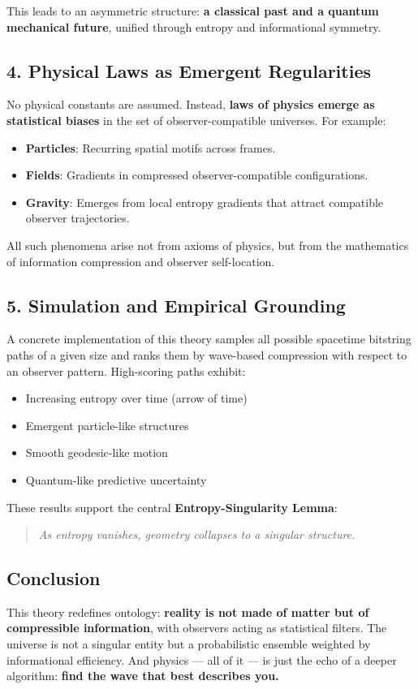 \documentclass[11pt]{article}
\begin{document}
This leads to an asymmetric structure: \textbf{a classical past and a quantum mechanical future}, unified through entropy and informational symmetry.

\subsection*{4. Physical Laws as Emergent Regularities}

No physical constants are assumed. Instead, \textbf{laws of physics emerge as statistical biases} in the set of observer-compatible universes. For example:

\begin{itemize}
      \item \textbf{Particles}: Recurring spatial motifs across frames.
      \item \textbf{Fields}: Gradients in compressed observer-compatible configurations.
      \item \textbf{Gravity}: Emerges from local entropy gradients that attract compatible observer trajectories.
\end{itemize}

All such phenomena arise not from axioms of physics, but from the mathematics of information compression and observer self-location.

\subsection*{5. Simulation and Empirical Grounding}

A concrete implementation of this theory samples all possible spacetime bitstring paths of a given size and ranks them by wave-based compression with respect to an observer pattern. High-scoring paths exhibit:

\begin{itemize}
      \item Increasing entropy over time (arrow of time)
      \item Emergent particle-like structures
      \item Smooth geodesic-like motion
      \item Quantum-like predictive uncertainty
\end{itemize}

These results support the central \textbf{Entropy-Singularity Lemma}:
\begin{quote}
      \textit{As entropy vanishes, geometry collapses to a singular structure.}
\end{quote}

\subsection*{Conclusion}

This theory redefines ontology: \textbf{reality is not made of matter but of compressible information}, with observers acting as statistical filters. The universe is not a singular entity but a probabilistic ensemble weighted by informational efficiency. And physics — all of it — is just the echo of a deeper algorithm: \textbf{find the wave that best describes you.}
\end{document}
